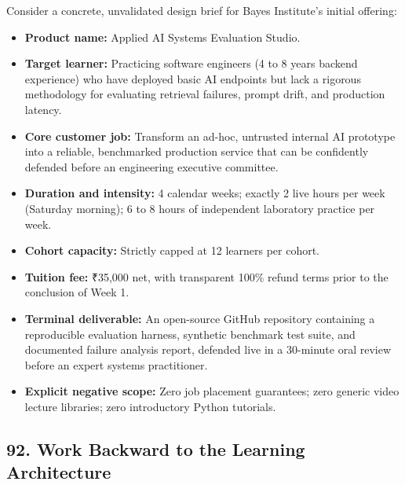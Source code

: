 Consider a concrete, unvalidated design brief for Bayes Institute's initial offering:
\begin{itemize}
    \item \textbf{Product name:} Applied AI Systems Evaluation Studio.
    \item \textbf{Target learner:} Practicing software engineers (4 to 8 years backend experience) who have deployed basic AI endpoints but lack a rigorous methodology for evaluating retrieval failures, prompt drift, and production latency.
    \item \textbf{Core customer job:} Transform an ad-hoc, untrusted internal AI prototype into a reliable, benchmarked production service that can be confidently defended before an engineering executive committee.
    \item \textbf{Duration and intensity:} 4 calendar weeks; exactly 2 live hours per week (Saturday morning); 6 to 8 hours of independent laboratory practice per week.
    \item \textbf{Cohort capacity:} Strictly capped at 12 learners per cohort.
    \item \textbf{Tuition fee:} ₹35,000 net, with transparent 100\% refund terms prior to the conclusion of Week 1.
    \item \textbf{Terminal deliverable:} An open-source GitHub repository containing a reproducible evaluation harness, synthetic benchmark test suite, and documented failure analysis report, defended live in a 30-minute oral review before an expert systems practitioner.
    \item \textbf{Explicit negative scope:} Zero job placement guarantees; zero generic video lecture libraries; zero introductory Python tutorials.
\end{itemize}

\subsection*{92. Work Backward to the Learning Architecture}


